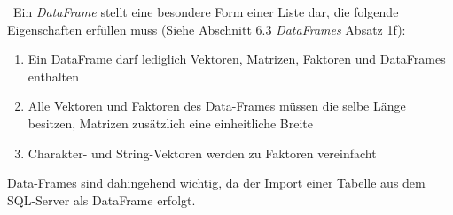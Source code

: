 ~\newline Ein \textit{DataFrame} stellt eine besondere Form einer Liste dar, die folgende Eigenschaften erfüllen muss (Siehe \cite{RIntro} Abschnitt 6.3 \textit{DataFrames} Absatz 1f): 
\begin{enumerate}
	\item Ein DataFrame darf lediglich Vektoren, Matrizen, Faktoren und DataFrames enthalten
	\item Alle Vektoren und Faktoren des Data-Frames müssen die selbe Länge besitzen, Matrizen zusätzlich eine einheitliche Breite
	\item Charakter- und String-Vektoren werden zu Faktoren vereinfacht
\end{enumerate} 
Data-Frames sind dahingehend wichtig, da der Import einer Tabelle aus dem SQL-Server als DataFrame erfolgt. 
